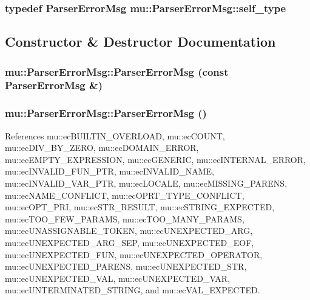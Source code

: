 \subsubsection[self\_\-type]{\setlength{\rightskip}{0pt plus 5cm}typedef {\bf ParserErrorMsg} {\bf mu::ParserErrorMsg::self\_\-type}}\label{classmu_1_1ParserErrorMsg_021c69b193a67c3f907d94648a2c23ef}




\subsection{Constructor \& Destructor Documentation}
\subsubsection[ParserErrorMsg]{\setlength{\rightskip}{0pt plus 5cm}mu::ParserErrorMsg::ParserErrorMsg (const {\bf ParserErrorMsg} \&)}\label{classmu_1_1ParserErrorMsg_3582c28dc06a0c08f6ddcba2c423491e}


\subsubsection[ParserErrorMsg]{\setlength{\rightskip}{0pt plus 5cm}mu::ParserErrorMsg::ParserErrorMsg ()}\label{classmu_1_1ParserErrorMsg_ac3208ea3586efee10cd75ee6f42ee25}




References mu::ecBUILTIN\_\-OVERLOAD, mu::ecCOUNT, mu::ecDIV\_\-BY\_\-ZERO, mu::ecDOMAIN\_\-ERROR, mu::ecEMPTY\_\-EXPRESSION, mu::ecGENERIC, mu::ecINTERNAL\_\-ERROR, mu::ecINVALID\_\-FUN\_\-PTR, mu::ecINVALID\_\-NAME, mu::ecINVALID\_\-VAR\_\-PTR, mu::ecLOCALE, mu::ecMISSING\_\-PARENS, mu::ecNAME\_\-CONFLICT, mu::ecOPRT\_\-TYPE\_\-CONFLICT, mu::ecOPT\_\-PRI, mu::ecSTR\_\-RESULT, mu::ecSTRING\_\-EXPECTED, mu::ecTOO\_\-FEW\_\-PARAMS, mu::ecTOO\_\-MANY\_\-PARAMS, mu::ecUNASSIGNABLE\_\-TOKEN, mu::ecUNEXPECTED\_\-ARG, mu::ecUNEXPECTED\_\-ARG\_\-SEP, mu::ecUNEXPECTED\_\-EOF, mu::ecUNEXPECTED\_\-FUN, mu::ecUNEXPECTED\_\-OPERATOR, mu::ecUNEXPECTED\_\-PARENS, mu::ecUNEXPECTED\_\-STR, mu::ecUNEXPECTED\_\-VAL, mu::ecUNEXPECTED\_\-VAR, mu::ecUNTERMINATED\_\-STRING, and mu::ecVAL\_\-EXPECTED.
